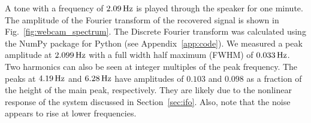 \documentclass[paper-main.tex]{subfiles}
\begin{document}
A tone with a frequency of $2.09\,{\rm Hz}$ is played through the speaker for one minute. 
The amplitude of the Fourier transform of the recovered signal is shown in Fig.~\ref{fig:webcam_spectrum}. The Discrete Fourier transform was calculated using the NumPy package for Python (see Appendix~\ref{app:code}).
We measured a peak amplitude at $2.099\,{\rm Hz}$ with a full width half maximum (FWHM) of $0.033\,{\rm Hz}$.
Two harmonics can also be seen at integer multiples of the peak frequency. 
The peaks at $4.19\,{\rm Hz}$ and $6.28\,{\rm Hz}$ have amplitudes of $0.103$ and $0.098$ as a fraction of the height of the main peak, respectively. They are likely due to the nonlinear response of the system discussed in Section~\ref{sec:ifo}.
Also, note that the noise appears to rise at lower frequencies.
\end{document}
